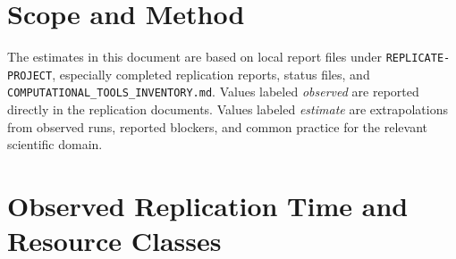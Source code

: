 \documentclass[11pt,letterpaper]{article}
\newcommand{\code}[1]{\texttt{#1}}
\newcommand{\est}{\emph{estimate}}
\newcommand{\obs}{\emph{observed}}
\begin{document}
\section{Scope and Method}

The estimates in this document are based on local report files under \code{REPLICATE-PROJECT}, especially completed replication reports, status files, and \code{COMPUTATIONAL\_TOOLS\_INVENTORY.md}. Values labeled \obs{} are reported directly in the replication documents. Values labeled \est{} are extrapolations from observed runs, reported blockers, and common practice for the relevant scientific domain.

\section{Observed Replication Time and Resource Classes}
\end{document}
